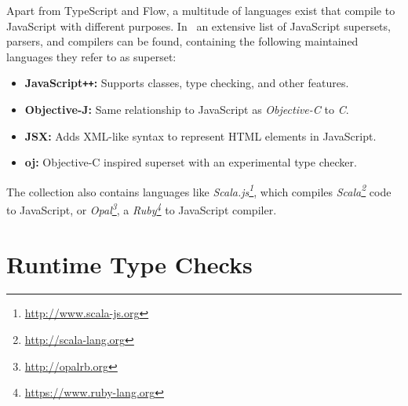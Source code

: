 Apart from TypeScript and Flow, a multitude of languages exist that compile to JavaScript with different purposes. In~\cite{LanguagesThatCompileToJS:CoffeeScript} an extensive list of JavaScript supersets, parsers, and compilers can be found, containing the following maintained languages they refer to as superset:
\begin{itemize}
  \item \textbf{JavaScript\texttt{++}:} Supports classes, type checking, and other features.
  \item \textbf{Objective-J:} Same relationship to JavaScript as \emph{Objective-C} to \emph{C}.
  \item \textbf{JSX:} Adds XML-like syntax to represent HTML elements in JavaScript.
  \item \textbf{oj:} Objective-C inspired superset with an experimental type checker.
\end{itemize}
The collection also contains languages like \emph{Scala.js\footnote{\url{http://www.scala-js.org}}}, which compiles \emph{Scala\footnote{\url{http://scala-lang.org}}} code to JavaScript, or \emph{Opal\footnote{\url{http://opalrb.org}}}, a \emph{Ruby\footnote{\url{https://www.ruby-lang.org}}} to JavaScript compiler.

\section{Runtime Type Checks}
\label{sec:runtime-type-checks}


